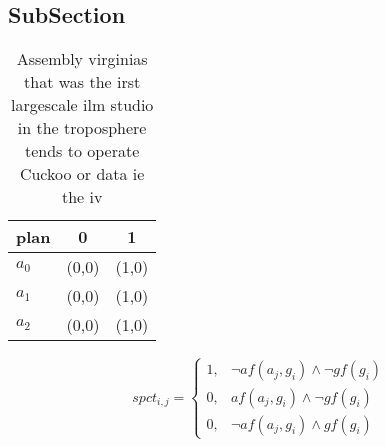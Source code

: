 \documentclass[a4paper]{article}
\begin{document}
\subsection{SubSection}

\begin{table}
\begin{adjustbox}{width=0.9\columnwidth}
\begin{tabular}{|l|l|l|}
\hline
\textbf{plan} & \multicolumn{1}{c|}{\textbf{0}} & \multicolumn{1}{c|}{\textbf{1}} \\ \hline
\textbf{$a_0$}  & (0,0) & (1,0) \\ \hline
\textbf{$a_1$}  & (0,0) & (1,0) \\ \hline
\textbf{$a_2$}  & (0,0) & (1,0) \\ \hline
\end{tabular}
\end{adjustbox}
\caption{Assembly virginias that was the irst largescale ilm studio in the troposphere tends to operate Cuckoo or data ie the iv
}
\end{table}

\begin{equation}
spct_{i,j} =
\begin{cases}
1, & \text{$\neg af(a_j,g_i) \wedge \neg gf(g_i)$}\\
0, & \text{$af(a_j,g_i) \wedge \neg gf(g_i)$}\\
0, & \text{$\neg af(a_j,g_i) \wedge gf(g_i)$}
\end{cases}
\end{equation}
\end{document}
